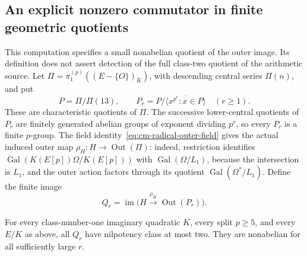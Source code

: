 \subsection{An explicit nonzero commutator in finite geometric quotients}
\label{subsec:cm-low-class-two}

This computation specifies a small nonabelian quotient of the
outer image.  Its definition does not assert detection of the full
class-two quotient of the arithmetic source.
Let \(\Pi=\pi_1^{(p)}((E-\{O\})_{\bar K})\), with descending central
series \(\Pi(n)\), and put
\[
 P=\Pi/\Pi(13),\qquad
 P_r=P/\overline{\langle x^{p^r}:x\in P\rangle}\quad(r\geq1).
\]
These are characteristic quotients of \(\Pi\). The successive
lower-central quotients of \(P_r\) are finitely generated abelian
groups of exponent dividing \(p^r\), so every \(P_r\) is a finite \(p\)-group.
The field identity~\eqref{eq:cm-radical-outer-field} gives the
actual induced outer map \(\rho_H:H\longrightarrow\operatorname{Out}(\Pi)\):
indeed, restriction identifies
\(\operatorname{Gal}(K(E[p])\Omega/K(E[p]))\) with
\(\operatorname{Gal}(\Omega/L_1)\), because the intersection is
\(L_1\), and the outer action factors through its quotient
\(\operatorname{Gal}(\Omega^*/L_1)\).
Define the finite image
\[
 Q_r=\operatorname{im}\bigl(H\xrightarrow{\rho_H}
                              \operatorname{Out}(P_r)\bigr).
\]

\begin{proposition}\label{prop:cm-small-nonabelian-image}
For every class-number-one imaginary quadratic \(K\), every
split \(p\geq5\), and every \(E/K\) as above, all \(Q_r\) have
nilpotency class at most two.  They are nonabelian for all
sufficiently large \(r\).
\end{proposition}

